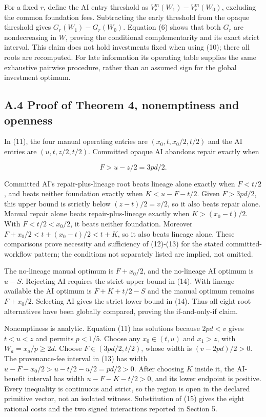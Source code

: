 \documentclass[
  11pt,
  a4paper,
]{article}
\begin{document}
For a fixed \(r\), define the AI entry threshold as
\(V_r^m(W_1)-V_r^m(W_0)\), excluding the common foundation fees.
Subtracting the early threshold from the opaque threshold gives
\(G_r(W_1)-G_r(W_0)\). Equation (6) shows that both \(G_r\) are
nondecreasing in \(W\), proving the conditional complementarity and its
exact strict interval. This claim does not hold investments fixed when
using (10); there all roots are recomputed. For late information its
operating table supplies the same exhaustive pairwise procedure, rather
than an assumed sign for the global investment optimum.

\subsection{A.4 Proof of Theorem 4, nonemptiness and
openness}\label{a.4-proof-of-theorem-4-nonemptiness-and-openness}

In (11), the four manual operating entries are \((x_0,t,x_0/2,t/2)\) and
the AI entries are \((u,t,z/2,t/2)\). Committed opaque AI abandons
repair exactly when

\[F>u-z/2=3pd/2.\]

Committed AI's repair-plus-lineage root beats lineage alone exactly when
\(F<t/2\), and beats neither foundation exactly when \(K<u-F-t/2\).
Given \(F>3pd/2\), this upper bound is strictly below \((z-t)/2=v/2\),
so it also beats repair alone. Manual repair alone beats
repair-plus-lineage exactly when \(K>(x_0-t)/2\). With \(F<t/2<x_0/2\),
it beats neither foundation. Moreover \(F+x_0/2<t+(x_0-t)/2<t+K\), so it
also beats lineage alone. These comparisons prove necessity and
sufficiency of (12)-(13) for the stated committed-workflow pattern; the
conditions not separately listed are implied, not omitted.

The no-lineage manual optimum is \(F+x_0/2\), and the no-lineage AI
optimum is \(u-S\). Rejecting AI requires the strict upper bound in
(14). With lineage available the AI optimum is \(F+K+t/2-S\) and the
manual optimum remains \(F+x_0/2\). Selecting AI gives the strict lower
bound in (14). Thus all eight root alternatives have been globally
compared, proving the if-and-only-if claim.

Nonemptiness is analytic. Equation (11) has solutions because \(2pd<v\)
gives \(t<u<z\) and permits \(p<1/5\). Choose any \(x_0\in(t,u)\) and
\(x_1>z\), with \(W_a=x_a/p\geq2d\). Choose \(F\in(3pd/2,t/2)\), whose
width is \((v-2pd)/2>0\). The provenance-fee interval in (13) has width
\(u-F-x_0/2>u-t/2-u/2=pd/2>0\). After choosing \(K\) inside it, the
AI-benefit interval has width \(u-F-K-t/2>0\), and its lower endpoint is
positive. Every inequality is continuous and strict, so the region is
open in the declared primitive vector, not an isolated witness.
Substitution of (15) gives the eight rational costs and the two signed
interactions reported in Section 5.
\end{document}
